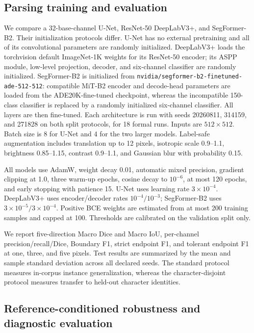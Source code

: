\subsection{Parsing training and evaluation}

We compare a 32-base-channel U-Net, ResNet-50 DeepLabV3+, and SegFormer-B2.
Their initialization protocols differ. U-Net has no external pretraining and
all of its convolutional parameters are randomly initialized. DeepLabV3+
loads the torchvision default ImageNet-1K weights for its ResNet-50 encoder;
its ASPP module, low-level projection, decoder, and six-channel classifier
are randomly initialized. SegFormer-B2 is initialized from
\texttt{nvidia/segformer-b2-finetuned-}\allowbreak
\texttt{ade-512-512}: compatible MiT-B2 encoder
and decode-head parameters are loaded from the ADE20K-fine-tuned checkpoint,
whereas the incompatible 150-class classifier is replaced by a randomly
initialized six-channel classifier. All layers are then fine-tuned. Each
architecture is run with seeds 20260811, 314159, and 271828 on both split
protocols, for 18 formal runs.
Inputs are \(512\times512\). Batch size is 8 for U-Net and 4 for the two larger
models. Label-safe augmentation includes translation up to 12 pixels,
isotropic scale 0.9--1.1, brightness 0.85--1.15, contrast 0.9--1.1, and
Gaussian blur with probability 0.15.

All models use AdamW, weight decay 0.01, automatic mixed precision, gradient
clipping at 1.0, three warm-up epochs, cosine decay to \(10^{-6}\), at most
120 epochs, and early stopping with patience 15. U-Net uses learning rate
\(3\times10^{-4}\). DeepLabV3+ uses encoder/decoder rates
\(10^{-4}/10^{-3}\); SegFormer-B2 uses
\(3\times10^{-5}/3\times10^{-4}\). Positive BCE weights are estimated from at
most 200 training samples and capped at 100. Thresholds are calibrated on the
validation split only.

We report five-direction Macro Dice and Macro IoU, per-channel
precision/recall/Dice, Boundary F1, strict endpoint F1, and tolerant endpoint
F1 at one, three, and five pixels. Test results are summarized by the mean and
sample standard deviation across all declared seeds. The standard protocol
measures in-corpus instance generalization, whereas the character-disjoint
protocol measures transfer to held-out character identities.

\subsection{Reference-conditioned robustness and diagnostic evaluation}

